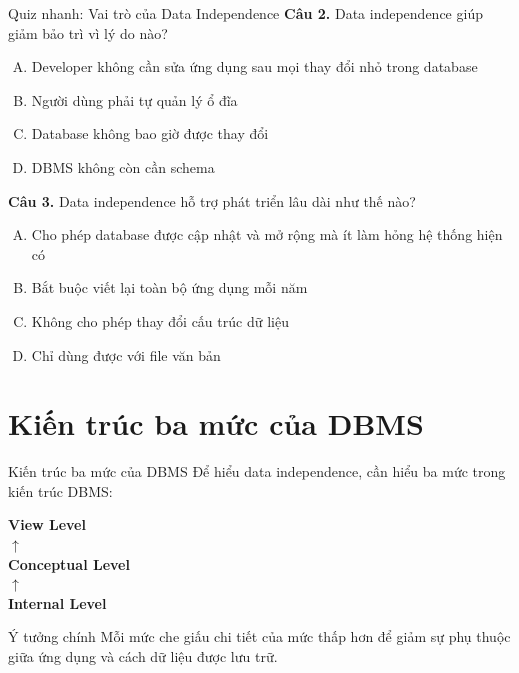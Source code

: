 \documentclass[aspectratio=169,11pt]{beamer}
\begin{document}
\begin{frame}{Quiz nhanh: Vai trò của Data Independence}
\textbf{Câu 2.} Data independence giúp giảm bảo trì vì lý do nào?
\begin{enumerate}[A.]
  \item Developer không cần sửa ứng dụng sau mọi thay đổi nhỏ trong database
  \item Người dùng phải tự quản lý ổ đĩa
  \item Database không bao giờ được thay đổi
  \item DBMS không còn cần schema
\end{enumerate}

\vspace{0.2cm}
\textbf{Câu 3.} Data independence hỗ trợ phát triển lâu dài như thế nào?
\begin{enumerate}[A.]
  \item Cho phép database được cập nhật và mở rộng mà ít làm hỏng hệ thống hiện có
  \item Bắt buộc viết lại toàn bộ ứng dụng mỗi năm
  \item Không cho phép thay đổi cấu trúc dữ liệu
  \item Chỉ dùng được với file văn bản
\end{enumerate}
\end{frame}

\section{Kiến trúc ba mức của DBMS}

\begin{frame}{Kiến trúc ba mức của DBMS}
Để hiểu data independence, cần hiểu ba mức trong kiến trúc DBMS:

\vspace{0.4cm}
\begin{center}
\Large
\textbf{View Level}\\[0.2cm]
$\uparrow$\\[0.2cm]
\textbf{Conceptual Level}\\[0.2cm]
$\uparrow$\\[0.2cm]
\textbf{Internal Level}
\end{center}

\vspace{0.2cm}
\begin{alertblock}{Ý tưởng chính}
Mỗi mức che giấu chi tiết của mức thấp hơn để giảm sự phụ thuộc giữa ứng dụng và cách dữ liệu được lưu trữ.
\end{alertblock}
\end{frame}
\end{document}
